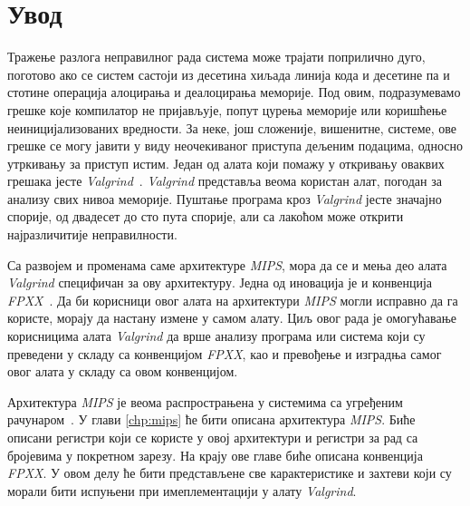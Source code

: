 \documentclass[12pt,oneside]{memoir}
\begin{document}
\frontmatter
\naslovna
\komisija
\apstrakt
\tableofcontents*

\mainmatter

\chapter{Увод}

\indent Тражење разлога неправилног рада система може трајати поприлично дуго, поготово ако се систем састоји из десетина хиљада линија кода и десетине па и стотине операција алоцирања и деалоцирања меморије. Под овим, подразумевамо грешке које компилатор не пријављује, попут цурења меморије или коришћење неиницијализованих вредности. За неке, још сложеније, вишенитне, системе, ове грешке се могу јавити у виду неочекиваног приступа дељеним подацима, односно утркивању за приступ истим. Један од алата који помажу у откривању оваквих грешака јесте \textit{Valgrind}~\cite{valgrindRef}. \textit{Valgrind} представља веома користан алат, погодан за анализу свих нивоа меморије. Пуштање програма кроз \textit{Valgrind} јесте значајно спорије, од двадесет до сто пута спорије, али са лакоћом може открити најразличитије неправилности.

\indent Са развојем и променама саме архитектуре \textit{MIPS}, мора да се и мења део алата \textit{Valgrind} специфичан за ову архитектуру. Једна од иновација је и конвенција \textit{FPXX}~\cite{fpxxRef}. Да би корисници овог алата на архитектури \textit{MIPS} могли исправно да га користе, морају да настану измене у самом алату. Циљ овог рада је омогућавање корисницима алата \textit{Valgrind} да врше анализу програма или система који су преведени у складу са конвенцијом \textit{FPXX}, као и превођење и изградња самог овог алата у складу са овом конвенцијом.

\indent Архитектура \textit{MIPS} је веома распрострањена у системима са угређеним рачунаром~\cite{SeeMIPSRun}. У глави \ref{chp:mips}  ће бити описана архитектура \textit{MIPS}. Биће описани регистри који се користе у овој архитектури и регистри за рад са бројевима у покретном зарезу. На крају ове главе биће описана конвенција \textit{FPXX}. У овом делу ће бити представљене све карактеристике и захтеви који су морали бити испуњени при имеплементацији у алату \textit{Valgrind}.
\end{document}
